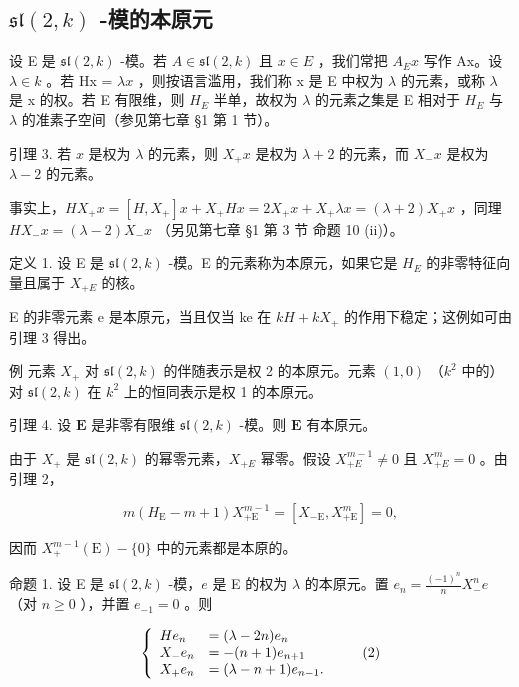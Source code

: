 \subsection{\texorpdfstring{\(\mathfrak{sl}(2,k)\) -模的本原元}{\textbackslash mathfrak\{sl\}(2,k) -模的本原元}}

设 E 是 \(\mathfrak{sl}(2,k)\) -模。若 \(A \in \mathfrak{sl}(2,k)\) 且 \(x \in E\) ，我们常把 \(A_{E}x\) 写作 Ax。设 \(\lambda \in k\) 。若 Hx = \(\lambda x\) ，则按语言滥用，我们称 x 是 E 中权为 \(\lambda\) 的元素，或称 \(\lambda\) 是 x 的权。若 E 有限维，则 \(H_{E}\) 半单，故权为 \(\lambda\) 的元素之集是 E 相对于 \(H_{E}\) 与 \(\lambda\) 的准素子空间（参见第七章 §1 第 1 节）。

引理 3. 若 \(x\) 是权为 \(\lambda\) 的元素，则 \(X_{+}x\) 是权为 \(\lambda + 2\) 的元素，而 \(X_{-}x\) 是权为 \(\lambda - 2\) 的元素。

事实上，\(HX_{+}x = [H,X_{+}]x + X_{+}Hx = 2X_{+}x + X_{+}\lambda x = (\lambda +2)X_{+}x\) ，同理 \(HX_{-}x = (\lambda -2)X_{-}x\) （另见第七章 §1 第 3 节 命题 10 (ii)）。

定义 1. 设 E 是 \(\mathfrak{sl}(2,k)\) -模。E 的元素称为本原元，如果它是 \(H_{E}\) 的非零特征向量且属于 \(X_{+E}\) 的核。

E 的非零元素 e 是本原元，当且仅当 ke 在 \(kH + kX_{+}\) 的作用下稳定；这例如可由引理 3 得出。

例 元素 \(X_{+}\) 对 \(\mathfrak{sl}(2,k)\) 的伴随表示是权 2 的本原元。元素 \((1,0)\) （\(k^{2}\) 中的）对 \(\mathfrak{sl}(2,k)\) 在 \(k^{2}\) 上的恒同表示是权 1 的本原元。

引理 4. 设 \(\mathbf{E}\) 是非零有限维 \(\mathfrak{sl}(2,k)\) -模。则 \(\mathbf{E}\) 有本原元。

由于 \(X_{+}\) 是 \(\mathfrak{sl}(2,k)\) 的幂零元素，\(X_{+E}\) 幂零。假设 \(X_{+E}^{m-1} \neq 0\) 且 \(X_{+E}^{m} = 0\) 。由引理 2，

\[
m (H _ {\mathrm{E}} - m + 1) X _ {+ \mathrm{E}} ^ {m - 1} = [ X _ {- \mathrm{E}}, X _ {+ \mathrm{E}} ^ {m} ] = 0,
\]

因而 \(X_{+}^{m - 1}(\mathrm{E}) - \{0\}\) 中的元素都是本原的。

命题 1. 设 E 是 \(\mathfrak{sl}(2,k)\) -模，\(e\) 是 E 的权为 \(\lambda\) 的本原元。置 \(e_n = \frac{(-1)^n}{n} X_-^n e\) （对 \(n \geq 0\) ），并置 \(e_{-1} = 0\) 。则

\[
\left\{ \begin{array}{l l} H e _ {n} & = (\lambda - 2 n) e _ {n} \\ X _ {-} e _ {n} & = - (n + 1) e _ {n + 1} \\ X _ {+} e _ {n} & = (\lambda - n + 1) e _ {n - 1}. \end{array} \right.\tag{2}
\]

